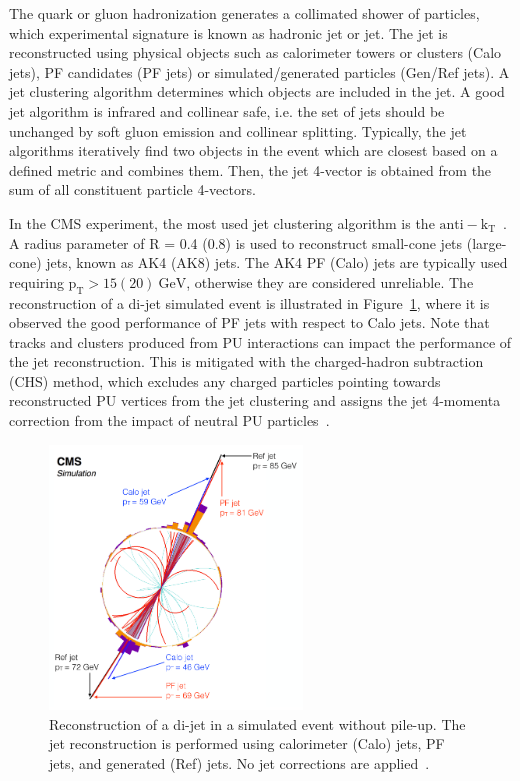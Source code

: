The quark or gluon hadronization generates a collimated shower of particles, which experimental signature is known as hadronic jet or jet. The jet is reconstructed using physical objects such as calorimeter towers or clusters (Calo jets), PF candidates (PF jets) or simulated/generated particles (Gen/Ref jets). A jet clustering algorithm determines which objects are included in the jet. A good jet algorithm is infrared and collinear safe, i.e. the set of jets should be unchanged by soft gluon emission and collinear splitting. Typically, the jet algorithms iteratively find two objects in the event which are closest based on a defined metric and combines them. Then, the jet 4-vector is obtained from the sum of all constituent particle 4-vectors. 

In the CMS experiment, the most used jet clustering algorithm is the $\mathrm{anti-k_{T}}$~\cite{Cacciari:2008gp,Cacciari:2011ma}. A radius parameter of R = 0.4 (0.8) is used to reconstruct small-cone jets (large-cone) jets, known as AK4 (AK8) jets. The AK4 PF (Calo) jets are typically used requiring $\mathrm{p_{T}>15 (20)~GeV}$, otherwise they are considered unreliable. The reconstruction of a di-jet simulated event is illustrated in Figure~\ref{fig:recojets}, where it is observed the good performance of PF jets with respect to Calo jets. Note that tracks and clusters produced from PU interactions can impact the performance of the jet reconstruction. This is mitigated with the charged-hadron subtraction (CHS) method, which excludes any charged particles pointing towards reconstructed PU vertices from the jet clustering and assigns the jet 4-momenta correction from the impact of neutral PU particles~\cite{cmspfalgo}.

\begin{figure}[ht!]
\centering
\includegraphics[width=0.6\textwidth]{Figures/Apparatus/dijetreco.png}
\caption[Reconstruction of a di-jet in a simulated event without pile-up]{Reconstruction of a di-jet in a simulated event without pile-up. The jet reconstruction is performed using calorimeter (Calo) jets, PF jets, and generated (Ref) jets. No jet corrections are applied~\cite{cmspfalgo}.}
\label{fig:recojets}
\end{figure}

